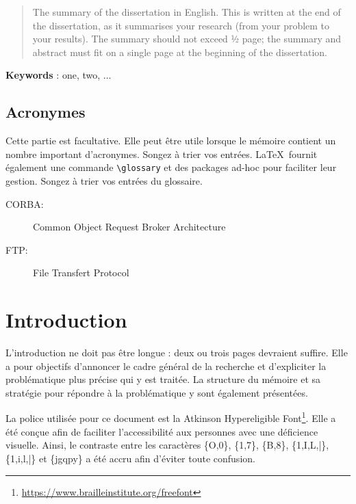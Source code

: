 \documentclass[a4paper,11pt]{book}
\renewcommand{\headrulewidth}{0pt} %
\newcommand{\pageblanche}{%
  \clearpage
  \thispagestyle{empty}
  \null
  \clearpage
}
\begin{document}
\begin{quote}
  The summary of the dissertation in English. This is written at the
  end of the dissertation, as it summarises your research (from your
  problem to your results). The summary should not exceed ½ page; the
  summary and abstract must fit on a single page at the beginning of
  the dissertation.
\end{quote}
\bigskip
\noindent\textbf{Keywords} : one, two, ...


\pageblanche


\tableofcontents

\pageblanche


\section*{Acronymes}

Cette partie est facultative. Elle peut être utile lorsque le mémoire
contient un nombre important d'acronymes. Songez à trier vos
entrées. \LaTeX\ fournit également une commande \verb+\glossary+ et
des packages ad-hoc pour faciliter leur gestion. Songez à trier vos
entrées du glossaire.

 \begin{description}
     \item[CORBA:]  Common Object Request Broker Architecture
     \item[FTP:] File Transfert Protocol
 \end{description}


\pageblanche


\renewcommand{\headrulewidth}{1pt} %

\setcounter{page}{1}
\fancyfoot[C]{\thepage}


\chapter{Introduction}


L'introduction ne doit pas être longue : deux ou trois pages devraient
suffire. Elle a pour objectifs d'annoncer le cadre général de la
recherche et d'expliciter la problématique plus précise qui y est
traitée. La structure du mémoire et sa stratégie pour répondre à la
problématique y sont également présentées.

La police utilisée pour ce document est la Atkinson Hypereligible
Font\footnote{\url{https://www.brailleinstitute.org/freefont}}. Elle a
été conçue afin de faciliter l'accessibilité aux personnes avec une
déficience visuelle. Ainsi, le contraste entre les caractères \{O,0\},
\{1,7\}, \{B,8\}, \{1,I,L,|\}, \{1,i,l,|\} et \{jgqpy\} a été accru
afin d'éviter toute confusion.
\end{document}
